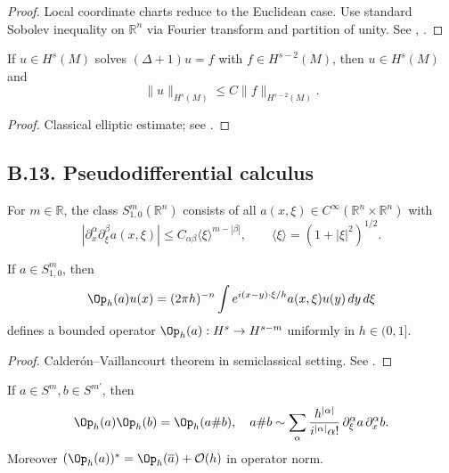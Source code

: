 \begin{proof}
Local coordinate charts reduce to the Euclidean case. Use standard Sobolev inequality on $\mathbb{R}^n$ via Fourier transform and partition of unity. See \cite{AdamsFournier}, \cite{Hebey}.
\end{proof}

\begin{corollary}
\label{cor:elliptic}
If $u\in H^s(M)$ solves $(\Delta+1)u=f$ with $f\in H^{s-2}(M)$, then $u\in H^s(M)$ and
\[
\|u\|_{H^s(M)} \le C \|f\|_{H^{s-2}(M)}.
\]
\end{corollary}

\begin{proof}
Classical elliptic estimate; see \cite[Thm.~6.3.1]{EvansPDE}.
\end{proof}

\subsection*{B.13. Pseudodifferential calculus}
\label{appB:psido}

\begin{definition}
For $m\in\mathbb{R}$, the class $S^m_{1,0}(\mathbb{R}^n)$ consists of all $a(x,\xi)\in C^\infty(\mathbb{R}^n\times \mathbb{R}^n)$ with
\[
|\partial_x^\alpha \partial_\xi^\beta a(x,\xi)| \le C_{\alpha\beta}\langle \xi\rangle^{m-|\beta|},\qquad \langle \xi\rangle=(1+|\xi|^2)^{1/2}.
\]
\end{definition}

\begin{theorem}
\label{thm:psido}
If $a\in S^m_{1,0}$, then
\[
\Op_h(a)u(x) = (2\pi h)^{-n}\int e^{i(x-y)\cdot \xi/h} a(x,\xi)u(y)\, dy\, d\xi
\]
defines a bounded operator $\Op_h(a): H^s\to H^{s-m}$ uniformly in $h\in(0,1]$.
\end{theorem}

\begin{proof}
Calderón–Vaillancourt theorem in semiclassical setting. See \cite[Prop.~14.1]{Zworski}.
\end{proof}

\begin{theorem}
\label{thm:composition}
If $a\in S^m, b\in S^{m'}$, then
\[
\Op_h(a)\Op_h(b) = \Op_h(a\# b),\quad
a\# b \sim \sum_{\alpha}\frac{h^{|\alpha|}}{i^{|\alpha|}\alpha!}\,\partial_\xi^\alpha a \,\partial_x^\alpha b.
\]
Moreover $(\Op_h(a))^* = \Op_h(\overline{a}) + \mathcal{O}(h)$ in operator norm.
\end{theorem}

